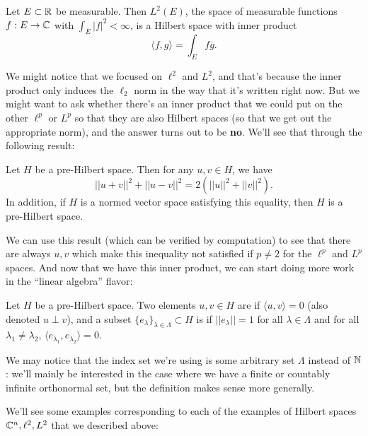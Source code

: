 \begin{example}
Let $E \subset \mathbb R$ be measurable. Then $L^2(E)$, the space of measurable functions $f: E \to \mathbb C$ with $\int_E |f|^2 < \infty$, is a Hilbert space with inner product 
\[
    \langle f, g \rangle = \int_E f\overline{g}.
\]
\end{example}

We might notice that we focused on $\ell^2$ and $L^2$, and that's because the inner product only induces the $\ell_2$ norm in the way that it's written right now. But we might want to ask whether there's an inner product that we could put on the other $\ell^p$ or $L^p$ so that they are also Hilbert spaces (so that we get out the appropriate norm), and the answer turns out to be \textbf{no}. We'll see that through the following result:

\begin{proposition}
Let $H$ be a pre-Hilbert space. Then for any $u, v \in H$, we have
\[
    ||u+v||^2 + ||u-v||^2 = 2\left(||u||^2 + ||v||^2\right).
\]
In addition, if $H$ is a normed vector space satisfying this equality, then $H$ is a pre-Hilbert space.
\end{proposition}

We can use this result (which can be verified by computation) to see that there are always $u, v$ which make this inequality not satisfied if $p \ne 2$ for the $\ell^p$ and $L^p$ spaces. And now that we have this inner product, we can start doing more work in the ``linear algebra'' flavor:

\begin{definition}
Let $H$ be a pre-Hilbert space. Two elements $u, v \in H$ are  if $\langle u, v \rangle = 0$ (also denoted $u \perp v$), and a subset $\{e_{\lambda}\}_{\lambda \in \Lambda} \subset H$ is  if $||e_{\lambda}|| = 1$ for all $\lambda \in \Lambda$ and for all $\lambda_1 \ne \lambda_2$, $\langle e_{\lambda_1}, e_{\lambda_2}\rangle = 0$.
\end{definition}

\begin{remark}
We may notice that the index set we're using is some arbitrary set $\Lambda$ instead of $\mathbb N$: we'll mainly be interested in the case where we have a finite or countably infinite orthonormal set, but the definition makes sense more generally.
\end{remark}

We'll see some examples corresponding to each of the examples of Hilbert spaces $\mathbb C^n, \ell^2, L^2$ that we described above:

